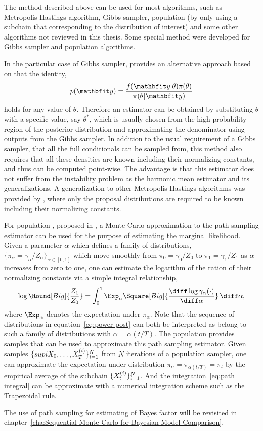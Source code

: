 The method described above can be used for most \mcmc algorithms, such as
Metropolis-Hastings algorithm, Gibbs sampler, population \mcmc (by only using
a subchain that corresponding to the distribution of interest) and some other
\mcmc algorithms not reviewed in this thesis. Some special method were
developed for Gibbs sampler and population \mcmc algorithms.

In the particular case of Gibbs sampler, \cite{Chib:1995em} provides an
alternative approach based on that the identity,
\begin{equation}
  p(\data) = \frac{f(\data|\theta)\pi(\theta)}{\pi(\theta|\data)}
\end{equation}
holds for any value of $\theta$. Therefore an estimator can be obtained by
substituting $\theta$ with a specific value, say $\theta^*$, which is usually
chosen from the high probability region of the posterior distribution and
approximating the denominator using outputs from the Gibbs sampler. In
addition to the usual requirement of a Gibbs sampler, that all the full
conditionals can be sampled from, this method also requires that all these
densities are known including their normalizing constants, and thus can be
computed point-wise. The advantage is that this estimator does not suffer from
the instability problem as the harmonic mean estimator and its
generalizations. A generalization to other Metropolis-Hastings algorithms was
provided by \cite{Chib:2001gq}, where only the proposal distributions are
required to be known including their normalizing constants.

For population \mcmc, proposed in \cite{Calderhead:2009bd}, a Monte Carlo
approximation to the path sampling estimator \cite{Gelman:1998ei} can be used
for the purpose of estimating the marginal likelihood. Given a parameter
$\alpha$ which defines a family of distributions, $\{\pi_{\alpha} =
\gamma_{\alpha}/Z_{\alpha}\}_{\alpha\in[0,1]}$ which move smoothly from $\pi_0
= \gamma_0/Z_0$ to $\pi_1 = \gamma_1/Z_1$ as $\alpha$ increases from zero to
one, one can estimate the logarithm of the ration of their normalizing
constants via a simple integral relationship,
\begin{equation}
  \log\Round[Big]{\frac{Z_1}{Z_0}} = \int_0^1\Exp_{\alpha}\Square[Big]{
    \frac{\diff\log\gamma_{\alpha}(\cdot)}{\diff\alpha}}\intd\alpha,
  \label{eq:path integral}
\end{equation}
where $\Exp_{\alpha}$ denotes the expectation under $\pi_{\alpha}$. Note that
the sequence of distributions in equation~\eqref{eq:power post} can both be
interpreted as belong to such a family of distributions with $\alpha =
\alpha(t/T)$. The population \mcmc provides samples that can be used to
approximate this path sampling estimator. Given samples
$\{supi{X_0},\dots,X_T^{(i)}\}_{i=1}^N$ from $N$ iterations of a population
\mcmc sampler, one can approximate the expectation under distribution
$\pi_{\alpha} = \pi_{\alpha(t/T)} = \pi_t$ by the empirical average of the
subchain $\{X_t^{(i)}\}_{i=1}^N$. And the integration~\eqref{eq:path
  integral} can be approximate with a numerical integration scheme such as
the Trapezoidal rule.

The use of path sampling for estimating of Bayes factor will be revisited in
chapter~\ref{cha:Sequential Monte Carlo for Bayesian Model Comparison}.
